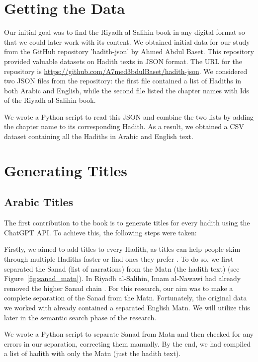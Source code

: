 \documentclass{svproc}
\begin{document}
\section{ Getting the Data}

Our initial goal was to find the Riyadh al-Salihin book in any digital format so that we could later work with its content. We obtained initial data for our study from the GitHub repository 'hadith-json' by Ahmed Abdul Baset. This repository provided valuable datasets on Hadith texts in JSON format. The URL for the repository is \url{https://github.com/A7med3bdulBaset/hadith-json}. We considered two JSON files from the repository: the first file contained a list of Hadiths in both Arabic and English, while the second file listed the chapter names with Ids of the Riyadh al-Salihin book.

We wrote a Python script to read this JSON and combine the two lists by adding the chapter name to its corresponding Hadith. As a result, we obtained a CSV dataset containing all the Hadiths in Arabic and English text.

\section{Generating Titles}

\subsection{Arabic Titles}

The first contribution to the book is to generate titles for every hadith using the ChatGPT API. To achieve this, the following steps were taken:

Firstly, we aimed to add titles to every Hadith, as titles can help people skim through multiple Hadiths faster or find ones they prefer \cite{reference}. To do so, we first separated the Sanad (list of narrations) from the Matn (the hadith text) (see Figure~\ref{fig:sanad_matn}). In Riyadh al-Salihin, Imam al-Nawawi had already removed the higher Sanad chain \cite{site1}. For this research, our aim was to make a complete separation of the Sanad from the Matn. Fortunately, the original data we worked with already contained a separated English Matn. We will utilize this later in the semantic search phase of the research.

We wrote a Python script to separate Sanad from Matn and then checked for any errors in our separation, correcting them manually. By the end, we had compiled a list of hadith with only the Matn (just the hadith text).
\end{document}
